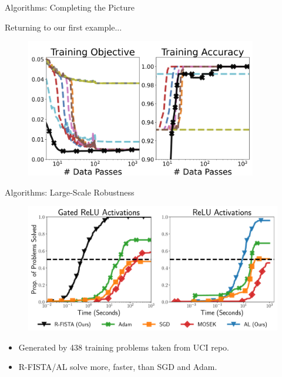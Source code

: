 \documentclass[usenames,dvipsnames,mathserif,notheorems]{beamer}
\begin{document}
\begin{frame}{Algorithms: Completing the Picture}
	\begin{center}
		\Large
		Returning to our first example...
	\end{center}

	\begin{figure}[]
		\centering
		\includegraphics[width=0.9\textwidth]{assets/synthetic_classification.png}
	\end{figure}
\end{frame}

\begin{frame}{Algorithms: Large-Scale Robustness}
	\begin{figure}[t]
		\centering
		\includegraphics[width=1\linewidth]{assets/pp_main.pdf}
	\end{figure}
	\begin{itemize}
		\item Generated by 438 training problems taken from UCI repo.
		\item R-FISTA/AL solve more, faster, than SGD and Adam.
	\end{itemize}
\end{frame}
\end{document}

